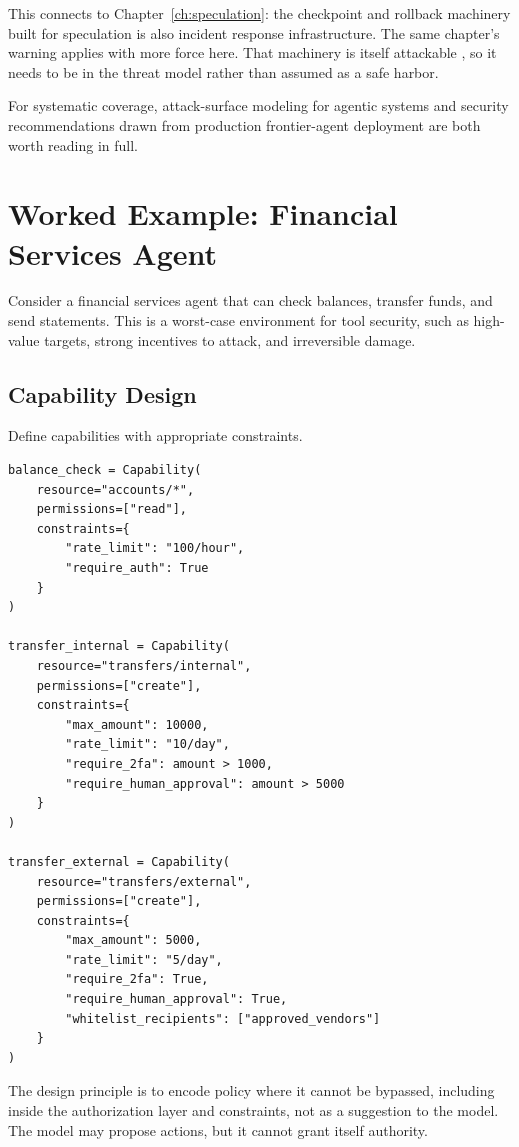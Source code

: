 This connects to Chapter~\ref{ch:speculation}: the checkpoint and rollback
machinery built for speculation is also incident response infrastructure. The same
chapter's warning applies with more force here. That machinery is itself
attackable \cite{saferesume2026}, so it needs to be in the threat model rather
than assumed as a safe harbor.

For systematic coverage, attack-surface modeling for agentic systems
\cite{matra2026} and security recommendations drawn from production frontier-agent
deployment \cite{secconsider2026} are both worth reading in full.

\section{Worked Example: Financial Services Agent}

Consider a financial services agent that can check balances, transfer funds, and send statements. This is a worst-case environment for tool security, such as high-value targets, strong incentives to attack, and irreversible damage.

\subsection{Capability Design}

Define capabilities with appropriate constraints. \begin{verbatim}
balance_check = Capability(
    resource="accounts/*",
    permissions=["read"],
    constraints={
        "rate_limit": "100/hour",
        "require_auth": True
    }
)

transfer_internal = Capability(
    resource="transfers/internal",
    permissions=["create"],
    constraints={
        "max_amount": 10000,
        "rate_limit": "10/day",
        "require_2fa": amount > 1000,
        "require_human_approval": amount > 5000
    }
)

transfer_external = Capability(
    resource="transfers/external",
    permissions=["create"],
    constraints={
        "max_amount": 5000,
        "rate_limit": "5/day",
        "require_2fa": True,
        "require_human_approval": True,
        "whitelist_recipients": ["approved_vendors"]
    }
)
\end{verbatim}

The design principle is to encode policy where it cannot be bypassed, including inside the authorization layer and constraints, not as a suggestion to the model. The model may propose actions, but it cannot grant itself authority.

